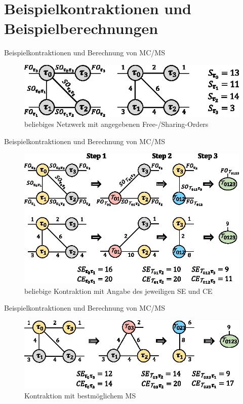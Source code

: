 \documentclass{beamer}
\begin{document}
\section{Beispielkontraktionen und Beispielberechnungen}

\begin{frame}{Beispielkontraktionen und Berechnung von MC/MS}
	\begin{figure}
		\includegraphics{figure_03_a}
		\caption*{beliebiges Netzwerk mit angegebenen Free-/Sharing-Orders}
	\end{figure}
\end{frame}

\begin{frame}{Beispielkontraktionen und Berechnung von MC/MS}
	\begin{figure}
		\includegraphics{figure_03_b}
		\caption*{beliebige Kontraktion mit Angabe des jeweiligen SE und CE}
	\end{figure}
\end{frame}

\begin{frame}{Beispielkontraktionen und Berechnung von MC/MS}
	\begin{figure}
		\includegraphics{figure_03_c}
		\caption*{Kontraktion mit bestmöglichem MS}
	\end{figure}
\end{frame}
\end{document}
